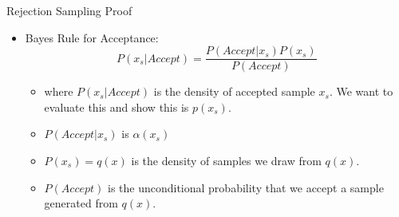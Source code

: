 \documentclass{beamer}
\begin{document}
\begin{frame}{Rejection Sampling Proof}
    
    \begin{itemize}
        
        \item Bayes Rule for Acceptance:
        \begin{equation}
            P(x_s|Accept) = \frac{P(Accept|x_s) P(x_s)}{P(Accept)}
        \end{equation}
        
        \begin{itemize}
           
        
        \item where $P(x_s|Accept)$ is the density of accepted sample $x_s$. We want to evaluate this and show this is $p(x_s)$.
        
        \pause
        
        \item $P(Accept|x_s)$ is $\alpha(x_s)$
        
        \pause
        \item $P(x_s) = q(x)$ is the density of samples we draw from $q(x)$.
        
        \pause 
        \item $P(Accept)$ is the unconditional probability that we accept a sample generated from $q(x)$.
    \end{itemize}

    \end{itemize}
    
    
\end{frame}
\end{document}
